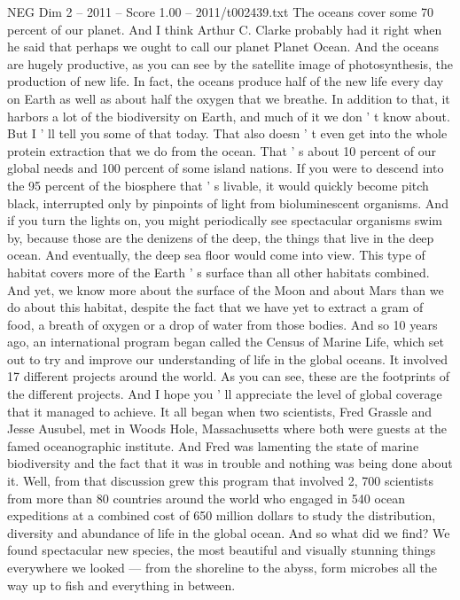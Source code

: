 \begin{textsample}{NEG Dim 2 – 2011 – Score 1.00 – 2011/t002439.txt}  \label{ex:f2_neg_015}
The oceans cover some 70 percent of our planet.
And I think Arthur C.
Clarke probably had it right when he said that perhaps we ought to call our planet Planet Ocean.
And the oceans are hugely productive, as you can see by the satellite image of photosynthesis, the production of new life.
In fact, the oceans produce half of the new life every day on Earth as well as about half the oxygen that we breathe.
In addition to that, it harbors a lot of the biodiversity on Earth, and much of it we don ' t know about.
But I ' ll tell you some of that today.
That also doesn ' t even get into the whole protein extraction that we do from the ocean.
That ' s about 10 percent of our global needs and 100 percent of some island nations.
If you were to descend into the 95 percent of the biosphere that ' s livable, it would quickly become pitch black, interrupted only by pinpoints of light from bioluminescent organisms.
And if you turn the lights on, you might periodically see spectacular organisms swim by, because those are the denizens of the deep, the things that live in the deep ocean.
And eventually, the deep sea floor would come into view.
This type of habitat covers more of the Earth ' s surface than all other habitats combined.
And yet, we know more about the surface of the Moon and about Mars than we do about this habitat, despite the fact that we have yet to extract a gram of food, a breath of oxygen or a drop of water from those bodies.
And so 10 years ago, an international program began called the Census of Marine Life, which set out to try and improve our understanding of life in the global oceans.
It involved 17 different projects around the world.
As you can see, these are the footprints of the different projects.
And I hope you ' ll appreciate the level of global coverage that it managed to achieve.
It all began when two scientists, Fred Grassle and Jesse Ausubel, met in Woods Hole, Massachusetts where both were guests at the famed oceanographic institute.
And Fred was lamenting the state of marine biodiversity and the fact that it was in trouble and nothing was being done about it.
Well, from that discussion grew this program that involved 2, 700 scientists from more than 80 countries around the world who engaged in 540 ocean expeditions at a combined cost of 650 million dollars to study the distribution, diversity and abundance of life in the global ocean.
And so what did we find?
We found spectacular new species, the most beautiful and visually stunning things everywhere we looked — from the shoreline to the abyss, form microbes all the way up to fish and everything in between.

\end{textsample}
